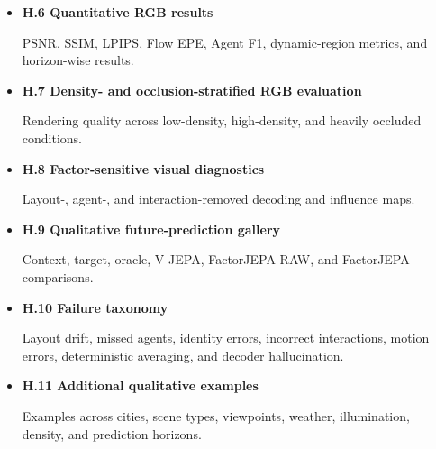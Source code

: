 \begin{itemize}
\begin{itemize}
    \item \textbf{H.6 Quantitative RGB results}
    
    PSNR, SSIM, LPIPS, Flow EPE, Agent F1, dynamic-region metrics, and
    horizon-wise results.

    \item \textbf{H.7 Density- and occlusion-stratified RGB evaluation}
    
    Rendering quality across low-density, high-density, and heavily
    occluded conditions.

    \item \textbf{H.8 Factor-sensitive visual diagnostics}
    
    Layout-, agent-, and interaction-removed decoding and influence
    maps.

    \item \textbf{H.9 Qualitative future-prediction gallery}
    
    Context, target, oracle, V-JEPA, FactorJEPA-RAW, and FactorJEPA
    comparisons.

    \item \textbf{H.10 Failure taxonomy}
    
    Layout drift, missed agents, identity errors, incorrect
    interactions, motion errors, deterministic averaging, and decoder
    hallucination.

    \item \textbf{H.11 Additional qualitative examples}
    
    Examples across cities, scene types, viewpoints, weather,
    illumination, density, and prediction horizons.
\end{itemize}
\fi  %

\end{itemize}




























\clearpage
\newpage








